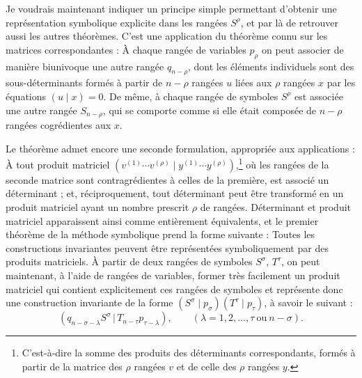 \documentclass[11pt]{article}
\newcommand{\pair}[2]{(#1\,|\,#2)}
\begin{document}
Je voudrais maintenant indiquer un principe simple permettant d'obtenir une représentation symbolique explicite dans les rangées $S^\rho$, et par là de retrouver aussi les autres théorèmes. C'est une application du théorème connu sur les matrices correspondantes : \og{} À chaque rangée de variables $p_\rho$ on peut associer de manière biunivoque une autre rangée $q_{n-\rho}$, dont les éléments individuels sont des sous-déterminants formés à partir de $n-\rho$ rangées $u$ liées aux $\rho$ rangées $x$ par les équations $(u\mid x)=0$. \fg{} De même, à chaque rangée de symboles $S^\rho$ est associée une autre rangée $S_{n-\rho}$, qui se comporte comme si elle était composée de $n-\rho$ rangées cogrédientes aux $x$.

Le théorème admet encore une seconde formulation, appropriée aux applications : \og{} À tout produit matriciel $(v^{(1)}\cdots v^{(\rho)}\mid y^{(1)}\cdots y^{(\rho)})$,\footnote{C'est-à-dire la somme des produits des déterminants correspondants, formés à partir de la matrice des $\rho$ rangées $v$ et de celle des $\rho$ rangées $y$.} où les rangées de la seconde matrice sont contragrédientes à celles de la première, est associé un déterminant ; et, réciproquement, tout déterminant peut être transformé en un produit matriciel ayant un nombre prescrit $\rho$ de rangées. \fg{} Déterminant et produit matriciel apparaissent ainsi comme entièrement équivalents, et le premier théorème de la méthode symbolique prend la forme suivante : \og{} Toutes les constructions invariantes peuvent être représentées symboliquement par des produits matriciels. \fg{} À partir de deux rangées de symboles $S^\sigma$, $T^\tau$, on peut maintenant, à l'aide de rangées de variables, former très facilement un produit matriciel qui contient explicitement ces rangées de symboles et représente donc une construction invariante de la forme $(S^\sigma\mid p_\sigma)(T^\tau\mid p_\tau)$, à savoir le suivant :
\begin{equation}
 \pair{q_{n-\sigma-\lambda}S^\sigma}{T_{n-\tau}p_{\tau-\lambda}},
 \qquad (\lambda=1,2,\ldots,\tau\ \text{ou}\ n-\sigma).
\tag{1}
\end{equation}
\end{document}
